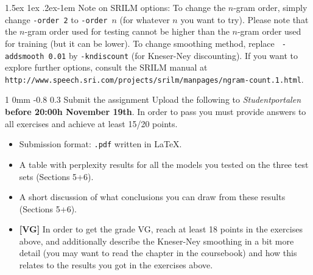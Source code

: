 \documentclass[11pt]{article}
\makeatletter
\newcommand{\newsec}[2]{\section{#1}\label{sec:#2}\noindent}
\renewcommand{\section}{\@startsection
{section}%
{1}%
{0mm}%
{-0.8\baselineskip}%
{0.3\baselineskip}%
{\bfseries\large}}%
\renewcommand{\paragraph}{%
  \@startsection{paragraph}{4}%
  {\z@}{1.5ex \@plus 1ex \@minus .2ex}{-1em}%
  {\normalfont\normalsize\bfseries}%
}\makeatother
\makeatother
\begin{document}
\paragraph{Note on SRILM options:} To change the $n$-gram order,
simply change {\tt -order\,2} to {\tt -order\,$n$} (for whatever $n$
you want to try).  Please note that the $n$-gram order used for
testing cannot be higher than the $n$-gram order used for training
(but it can be lower). To change smoothing method, replace {\tt
  -addsmooth\,0.01} by {\tt -kndiscount} (for Kneser-Ney
discounting). If you want to explore further options, consult the
SRILM manual at {\small {\tt
    http://www.speech.sri.com/projects/srilm/manpages/ngram-count.1.html}}.

\newsec{Submit the assignment}{submit}%
Upload the following to {\it Studentportalen}
\textbf{before 20:00h November 19th}. In order to pass you must
provide answers to all exercises and achieve at least 15/20 points.

\begin{itemize}[noitemsep,topsep=0.2cm]
\item Submission format: \texttt{.pdf} written in \LaTeX.
\item A table with perplexity results for all the models you tested on
  the three test sets (Sections 5+6).
\item A short discussion of what conclusions you can draw from these
  results (Sections 5+6).
\item \textbf{[VG]} In order to get the grade VG, reach at least 18
  points in the exercises above, and additionally describe the
  Kneser-Ney smoothing in a bit more detail (you may want to read the
  chapter in the coursebook) and how this relates to the results you
  got in the exercises above.

\end{itemize}
\end{document}

